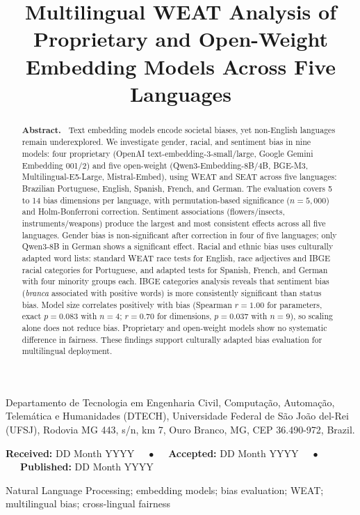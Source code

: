 \documentclass{sbc2019}
\title[Multilingual WEAT Analysis of Embedding Models]{Multilingual WEAT Analysis of Proprietary and Open-Weight Embedding Models Across Five Languages}
\author[Sansão 2026]{
\affil{\textbf{João Pedro Hallack Sansão}~\href{https://orcid.org/0000-0003-0095-2629}{\textcolor{orcidlogo}{\aiOrcid}}~\textcolor{blue}{\faEnvelopeO}~~[~\textbf{Universidade Federal de São João del-Rei}~|\href{mailto:joao@ufsj.edu.br}{~\textbf{\textit{joao@ufsj.edu.br}}}~]}
}
\begin{document}
\begin{frontmatter}
\maketitle

\begin{mail}
Departamento de Tecnologia em Engenharia Civil, Computação, Automação, Telemática e Humanidades (DTECH), Universidade Federal de São João del-Rei (UFSJ), Rodovia MG 443, s/n, km 7, Ouro Branco, MG, CEP 36.490-972, Brazil.
\end{mail}

\begin{dates}
\small{\textbf{Received:} DD Month YYYY~~~$\bullet$~~~\textbf{Accepted:} DD Month YYYY~~~$\bullet$~~~\textbf{Published:} DD Month YYYY}
\end{dates}

\begin{abstract}
\textbf{Abstract.~}
\noindent Text embedding models encode societal biases, yet non-English languages remain underexplored. We investigate gender, racial, and sentiment bias in nine models: four proprietary (OpenAI text-embedding-3-small/large, Google Gemini Embedding 001/2) and five open-weight (Qwen3-Embedding-8B/4B, BGE-M3, Multilingual-E5-Large, Mistral-Embed), using WEAT and SEAT across five languages: Brazilian Portuguese, English, Spanish, French, and German. The evaluation covers 5 to 14 bias dimensions per language, with permutation-based significance ($n=5{,}000$) and Holm-Bonferroni correction. Sentiment associations (flowers/insects, instruments/weapons) produce the largest and most consistent effects across all five languages. Gender bias is non-significant after correction in four of five languages; only Qwen3-8B in German shows a significant effect. Racial and ethnic bias uses culturally adapted word lists: standard WEAT race tests for English, race adjectives and IBGE racial categories for Portuguese, and adapted tests for Spanish, French, and German with four minority groups each. IBGE categories analysis reveals that sentiment bias (\textit{branca} associated with positive words) is more consistently significant than status bias. Model size correlates positively with bias (Spearman $r = 1.00$ for parameters, exact $p = 0.083$ with $n=4$; $r = 0.70$ for dimensions, $p = 0.037$ with $n=9$), so scaling alone does not reduce bias. Proprietary and open-weight models show no systematic difference in fairness. These findings support culturally adapted bias evaluation for multilingual deployment.
\end{abstract}

\begin{keywords}
Natural Language Processing; embedding models; bias evaluation; WEAT; multilingual bias; cross-lingual fairness
\end{keywords}

\end{frontmatter}
\end{document}
